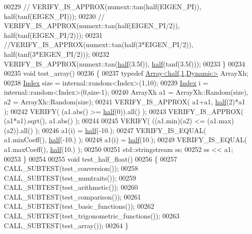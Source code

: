 \begin{DoxyCode}
00229   \textcolor{comment}{//  VERIFY\_IS\_APPROX(numext::tan(half(EIGEN\_PI)), half(tanf(EIGEN\_PI)));}
00230   \textcolor{comment}{//  VERIFY\_IS\_APPROX(numext::tan(half(EIGEN\_PI/2)), half(tanf(EIGEN\_PI/2)));}
00231   \textcolor{comment}{//VERIFY\_IS\_APPROX(numext::tan(half(3*EIGEN\_PI/2)), half(tanf(3*EIGEN\_PI/2)));}
00232   VERIFY\_IS\_APPROX(numext::tan(\hyperlink{struct_eigen_1_1half}{half}(3.5f)), \hyperlink{struct_eigen_1_1half}{half}(tanf(3.5f)));
00233 \}
00234 
00235 \textcolor{keywordtype}{void} test\_array()
00236 \{
00237   \textcolor{keyword}{typedef} \hyperlink{group___core___module_class_eigen_1_1_array}{Array<half,1,Dynamic>} ArrayXh;
00238   \hyperlink{namespace_eigen_a62e77e0933482dafde8fe197d9a2cfde}{Index} size = internal::random<Index>(1,10);
00239   \hyperlink{namespace_eigen_a62e77e0933482dafde8fe197d9a2cfde}{Index} i = internal::random<Index>(0,size-1);
00240   ArrayXh a1 = ArrayXh::Random(size), a2 = ArrayXh::Random(size);
00241   VERIFY\_IS\_APPROX( a1+a1, \hyperlink{struct_eigen_1_1half}{half}(2)*a1 );
00242   VERIFY( (a1.abs() >= \hyperlink{struct_eigen_1_1half}{half}(0)).all() );
00243   VERIFY\_IS\_APPROX( (a1*a1).sqrt(), a1.abs() );
00244 
00245   VERIFY( ((a1.min)(a2) <= (a1.max)(a2)).all() );
00246   a1(i) = \hyperlink{struct_eigen_1_1half}{half}(-10.);
00247   VERIFY\_IS\_EQUAL( a1.minCoeff(), \hyperlink{struct_eigen_1_1half}{half}(-10.) );
00248   a1(i) = \hyperlink{struct_eigen_1_1half}{half}(10.);
00249   VERIFY\_IS\_EQUAL( a1.maxCoeff(), \hyperlink{struct_eigen_1_1half}{half}(10.) );
00250 
00251   std::stringstream ss;
00252   ss << a1;
00253 \}
00254 
00255 \textcolor{keywordtype}{void} test\_half\_float()
00256 \{
00257   CALL\_SUBTEST(test\_conversion());
00258   CALL\_SUBTEST(test\_numtraits());
00259   CALL\_SUBTEST(test\_arithmetic());
00260   CALL\_SUBTEST(test\_comparison());
00261   CALL\_SUBTEST(test\_basic\_functions());
00262   CALL\_SUBTEST(test\_trigonometric\_functions());
00263   CALL\_SUBTEST(test\_array());
00264 \}
\end{DoxyCode}
